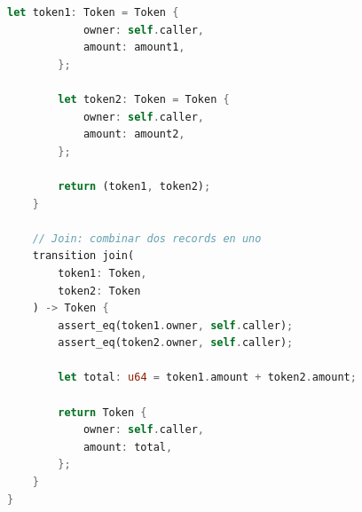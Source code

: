 \documentclass[11pt,a4paper,twoside]{book}
\theoremstyle{definition}
\theoremstyle{remark}
\begin{document}
\begin{lstlisting}[language=Rust, caption={Programa Leo: Token privado}]
        let token1: Token = Token {
            owner: self.caller,
            amount: amount1,
        };
        
        let token2: Token = Token {
            owner: self.caller,
            amount: amount2,
        };
        
        return (token1, token2);
    }
    
    // Join: combinar dos records en uno
    transition join(
        token1: Token,
        token2: Token
    ) -> Token {
        assert_eq(token1.owner, self.caller);
        assert_eq(token2.owner, self.caller);
        
        let total: u64 = token1.amount + token2.amount;
        
        return Token {
            owner: self.caller,
            amount: total,
        };
    }
}
\end{lstlisting}
\end{document}
